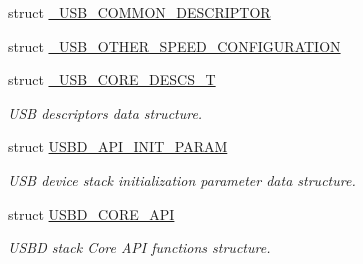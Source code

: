 \begin{DoxyCompactItemize}
\item 
struct \hyperlink{struct___u_s_b___c_o_m_m_o_n___d_e_s_c_r_i_p_t_o_r}{\+\_\+\+U\+S\+B\+\_\+\+C\+O\+M\+M\+O\+N\+\_\+\+D\+E\+S\+C\+R\+I\+P\+T\+OR}
\item 
struct \hyperlink{struct___u_s_b___o_t_h_e_r___s_p_e_e_d___c_o_n_f_i_g_u_r_a_t_i_o_n}{\+\_\+\+U\+S\+B\+\_\+\+O\+T\+H\+E\+R\+\_\+\+S\+P\+E\+E\+D\+\_\+\+C\+O\+N\+F\+I\+G\+U\+R\+A\+T\+I\+ON}
\item 
struct \hyperlink{struct___u_s_b___c_o_r_e___d_e_s_c_s___t}{\+\_\+\+U\+S\+B\+\_\+\+C\+O\+R\+E\+\_\+\+D\+E\+S\+C\+S\+\_\+T}
\begin{DoxyCompactList}\small\item\em U\+SB descriptors data structure. \end{DoxyCompactList}\item 
struct \hyperlink{struct_u_s_b_d___a_p_i___i_n_i_t___p_a_r_a_m}{U\+S\+B\+D\+\_\+\+A\+P\+I\+\_\+\+I\+N\+I\+T\+\_\+\+P\+A\+R\+AM}
\begin{DoxyCompactList}\small\item\em U\+SB device stack initialization parameter data structure. \end{DoxyCompactList}\item 
struct \hyperlink{struct_u_s_b_d___c_o_r_e___a_p_i}{U\+S\+B\+D\+\_\+\+C\+O\+R\+E\+\_\+\+A\+PI}
\begin{DoxyCompactList}\small\item\em U\+S\+BD stack Core A\+PI functions structure. \end{DoxyCompactList}\end{DoxyCompactItemize}
